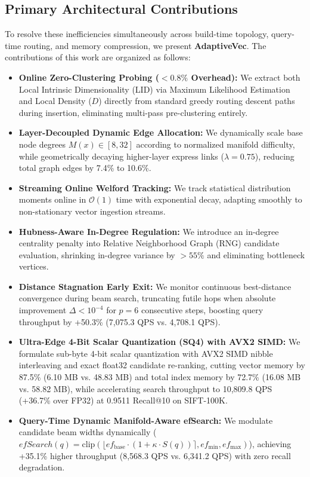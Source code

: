 \documentclass[conference,10pt]{IEEEtran}
\begin{document}
\subsection{Primary Architectural Contributions}
To resolve these inefficiencies simultaneously across build-time topology, query-time routing, and memory compression, we present \textbf{AdaptiveVec}. The contributions of this work are organized as follows:
\begin{itemize}
    \item \textbf{Online Zero-Clustering Probing ($<0.8\%$ Overhead):} We extract both Local Intrinsic Dimensionality (LID) via Maximum Likelihood Estimation and Local Density ($D$) directly from standard greedy routing descent paths during insertion, eliminating multi-pass pre-clustering entirely.
    \item \textbf{Layer-Decoupled Dynamic Edge Allocation:} We dynamically scale base node degrees $M(x) \in [8, 32]$ according to normalized manifold difficulty, while geometrically decaying higher-layer express links ($\lambda = 0.75$), reducing total graph edges by 7.4\% to 10.6\%.
    \item \textbf{Streaming Online Welford Tracking:} We track statistical distribution moments online in $\mathcal{O}(1)$ time with exponential decay, adapting smoothly to non-stationary vector ingestion streams.
    \item \textbf{Hubness-Aware In-Degree Regulation:} We introduce an in-degree centrality penalty into Relative Neighborhood Graph (RNG) candidate evaluation, shrinking in-degree variance by $>55\%$ and eliminating bottleneck vertices.
    \item \textbf{Distance Stagnation Early Exit:} We monitor continuous best-distance convergence during beam search, truncating futile hops when absolute improvement $\Delta < 10^{-4}$ for $p=6$ consecutive steps, boosting query throughput by +50.3\% (7,075.3 QPS vs. 4,708.1 QPS).
    \item \textbf{Ultra-Edge 4-Bit Scalar Quantization (SQ4) with AVX2 SIMD:} We formulate sub-byte 4-bit scalar quantization with AVX2 SIMD nibble interleaving and exact float32 candidate re-ranking, cutting vector memory by 87.5\% (6.10 MB vs. 48.83 MB) and total index memory by 72.7\% (16.08 MB vs. 58.82 MB), while accelerating search throughput to 10,809.8 QPS (+36.7\% over FP32) at 0.9511 Recall@10 on SIFT-100K.
    \item \textbf{Query-Time Dynamic Manifold-Aware efSearch:} We modulate candidate beam widths dynamically ($efSearch(q) = \text{clip}(\lfloor ef_{\text{base}} \cdot (1 + \kappa \cdot S(q))\rceil, ef_{\text{min}}, ef_{\text{max}})$), achieving +35.1\% higher throughput (8,568.3 QPS vs. 6,341.2 QPS) with zero recall degradation.

\end{itemize}
\end{document}
